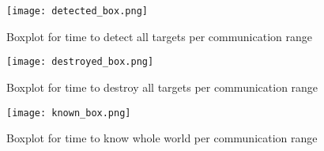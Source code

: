 \begin{figure}[H]
	\centering
	\texttt{[image: detected\_box.png]}
	\caption{Boxplot for time to detect all targets per communication range}
	\label{fig:detectBoxPlot}
\end{figure}

\begin{figure}[H]
	\centering
	\texttt{[image: destroyed\_box.png]}
	\caption{Boxplot for time to destroy all targets per communication range}
	\label{fig:destroyedBoxPlot}
\end{figure}

\begin{figure}[H]
	\centering
	\texttt{[image: known\_box.png]}
	\caption{Boxplot for time to know whole world per communication range}
	\label{fig:knownBoxPlot}
\end{figure}

